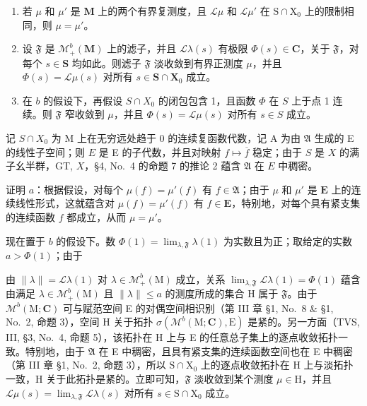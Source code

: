 \begin{enumerate}
\def\labelenumi{\alph{enumi})}
\item
  若 \(\mu\) 和 \(\mu'\) 是 \(\mathbf{M}\) 上的两个有界复测度，且 \(\mathcal{L}\mu\) 和 \(\mathcal{L}\mu'\) 在 \(\mathrm{S} \cap \mathrm{X}_0\) 上的限制相同，则 \(\mu = \mu'\)。
\item
  设 \(\mathfrak{F}\) 是 \(\mathcal{M}_{+}^{b}(\mathbf{M})\) 上的滤子，并且 \(\mathcal{L}\lambda(s)\) 有极限 \(\Phi(s) \in \mathbf{C}\)，关于 \(\mathfrak{F}\)，对每个 \(s \in \mathbf{S}\) 均如此。则滤子 \(\mathfrak{F}\) 淡收敛到有界正测度 \(\mu\)，并且 \(\Phi(s) = \mathcal{L}\mu(s)\) 对所有 \(s \in \mathbf{S} \cap \mathbf{X}_0\) 成立。
\item
  在 \(b\) 的假设下，再假设 \(S \cap X_0\) 的闭包包含 1，且函数 \(\Phi\) 在 \(S\) 上于点 1 连续。则 \(\mathfrak{F}\) 窄收敛到 \(\mu\)，并且 \(\Phi(s) = \mathcal{L}\mu(s)\) 对所有 \(s \in S\) 成立。
\end{enumerate}

记 \(S \cap X_0\) 为 M 上在无穷远处趋于 0 的连续复函数代数，记 A 为由 \(\mathfrak{A}\) 生成的 E 的线性子空间；则 \(E\) 是 E 的子代数，并且对映射 \(f \mapsto \overline{f}\) 稳定；由于 \(S\) 是 \(X\) 的满子幺半群，GT, \(X\)，§4, No.~4 的命题 7 的推论 2 蕴含 \(\mathfrak{A}\) 在 \(E\) 中稠密。

证明 \(a\)：根据假设，对每个 \(\mu(f) = \mu'(f)\) 有 \(f \in \mathfrak{A}\)；由于 \(\mu\) 和 \(\mu'\) 是 \(\mathbf{E}\) 上的连续线性形式，这就蕴含对 \(\mu(f) = \mu'(f)\) 有 \(f \in \mathbf{E}\)，特别地，对每个具有紧支集的连续函数 \(f\) 都成立，从而 \(\mu = \mu'\)。

现在置于 \(b\) 的假设下。数 \(\Phi(1) = \lim_{\lambda, \mathfrak{F}} \lambda(1)\) 为实数且为正；取给定的实数 \(a > \Phi(1)\)；由于

由 \(\| \lambda \| = \mathcal{L}\lambda (1)\) 对 \(\lambda \in \mathcal{M}_{+}^{b}(\mathrm{M})\) 成立，关系 \(\lim_{\lambda ,\mathfrak{F}}\mathcal{L}\lambda (1) = \Phi (1)\) 蕴含由满足 \(\lambda \in \mathcal{M}_{+}^{b}(\mathrm{M})\) 且 \(\| \lambda \| \leqslant a\) 的测度所成的集合 H 属于 \(\mathfrak{F}\)。由于 \(\mathcal{M}^b (\mathrm{M};\mathbf{C})\) 可与赋范空间 E 的对偶空间相识别（第 III 章 §1, No.~8 \& §1, No.~2, 命题 3），空间 H 关于拓扑 \(\sigma (\mathcal{M}^b (\mathrm{M};\mathbf{C}),\mathrm{E})\) 是紧的。另一方面（TVS, III, §3, No.~4, 命题 5），该拓扑在 H 上与 E 的任意总子集上的逐点收敛拓扑一致。特别地，由于 \(\mathfrak{A}\) 在 E 中稠密，且具有紧支集的连续函数空间也在 E 中稠密（第 III 章 §1, No.~2, 命题 3），所以 \(\mathrm{S}\cap \mathrm{X}_0\) 上的逐点收敛拓扑在 H 上与淡拓扑一致，H 关于此拓扑是紧的。立即可知，\(\mathfrak{F}\) 淡收敛到某个测度 \(\mu \in \mathrm{H}\)，并且 \(\mathcal{L}\mu (s) = \lim_{\lambda ,\mathfrak{F}}\mathcal{L}\lambda (s)\) 对所有 \(s\in \mathrm{S}\cap \mathrm{X}_0\) 成立。

